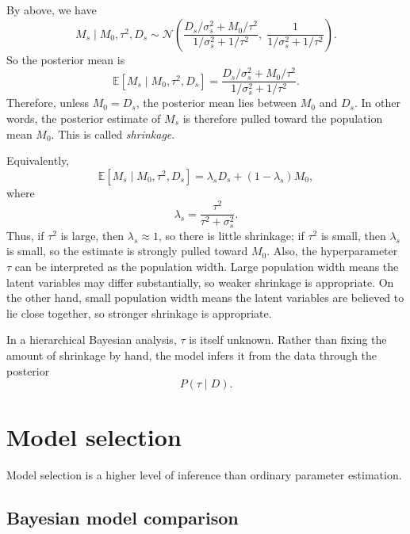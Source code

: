 \documentclass[11pt, titlepage]{article} %
\numberwithin{equation}{section}
\theoremstyle{definition}
\numberwithin{assumption}{section}
\begin{document}
By above, we have
\begin{equation*}
    M_s\mid M_0,\tau^2,D_s
    \sim
    \mathcal{N}\!\left(
    \frac{D_s/\sigma_s^2 + M_0/\tau^2}{1/\sigma_s^2+1/\tau^2},
    \;
    \frac{1}{1/\sigma_s^2+1/\tau^2}
    \right).
\end{equation*}
So the posterior mean is
\begin{equation*}
    \mathbb{E}[M_s\mid M_0,\tau^2,D_s]
    =
    \frac{D_s/\sigma_s^2 + M_0/\tau^2}{1/\sigma_s^2+1/\tau^2}.
\end{equation*}
Therefore, unless $M_0=D_s$, the posterior mean lies between $M_0$ and $D_s$. In other words, the posterior estimate of $M_s$ is therefore pulled toward the population mean $M_0$. This is called \textit{shrinkage}.

Equivalently,
\begin{equation*}
    \mathbb{E}[M_s\mid M_0,\tau^2,D_s]
    =
    \lambda_s D_s + (1-\lambda_s)M_0,
\end{equation*}
where
\begin{equation*}
    \lambda_s=\frac{\tau^2}{\tau^2+\sigma_s^2}.
\end{equation*}
Thus, if $\tau^2$ is large, then $\lambda_s\approx 1$, so there is little shrinkage; if $\tau^2$ is small, then $\lambda_s$ is small, so the estimate is strongly pulled toward $M_0$. Also, the hyperparameter $\tau$ can be interpreted as the population width. Large population width means the latent variables may differ substantially, so weaker shrinkage is appropriate. On the other hand, small population width means the latent variables are believed to lie close together, so stronger shrinkage is appropriate. 



In a hierarchical Bayesian analysis, $\tau$ is itself unknown. Rather than fixing the amount of shrinkage by hand, the model infers it from the data through the posterior
\begin{equation*}
    P(\tau\mid D).
\end{equation*}


\section{Model selection}
Model selection is a higher level of inference than ordinary parameter estimation.

\subsection{Bayesian model comparison}
\end{document}
